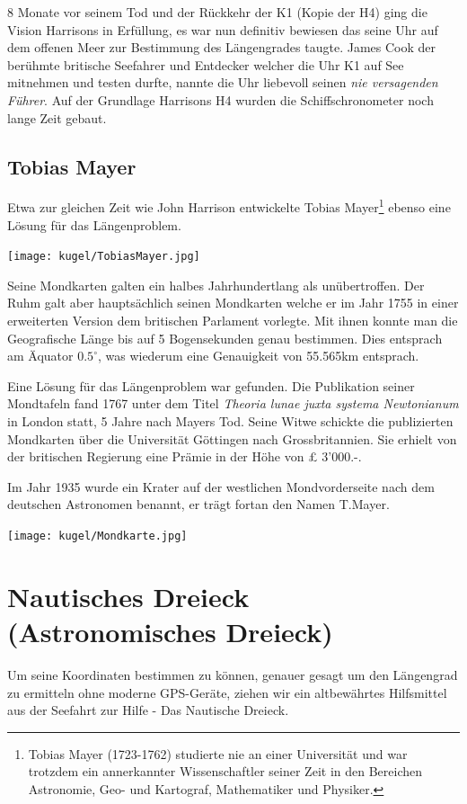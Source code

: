 \begin{refsection}
8 Monate vor seinem Tod und der Rückkehr der K1 (Kopie der H4) ging die Vision Harrisons in Erfüllung, es war nun definitiv bewiesen das seine Uhr auf dem offenen Meer zur Bestimmung des Längengrades taugte. James Cook der berühmte britische Seefahrer und Entdecker welcher die Uhr K1 auf See mitnehmen und testen durfte, nannte die Uhr liebevoll seinen \textit{nie versagenden Führer}.
Auf der Grundlage Harrisons H4 wurden die Schiffschronometer noch lange Zeit gebaut.



\subsection{Tobias Mayer}
Etwa zur gleichen Zeit wie John Harrison entwickelte Tobias Mayer\footnote{%
Tobias Mayer (1723-1762) studierte nie an einer Universität und war trotzdem ein annerkannter Wissenschaftler seiner Zeit in den Bereichen Astronomie, Geo- und Kartograf, Mathematiker und Physiker.}
ebenso eine Lösung für das Längenproblem.
\begin{center}
        \texttt{[image: kugel/TobiasMayer.jpg]}
\end{center}
Seine Mondkarten galten ein halbes Jahrhundertlang als unübertroffen. Der Ruhm galt aber hauptsächlich seinen Mondkarten welche er im Jahr 1755 in einer erweiterten Version dem britischen Parlament vorlegte.
Mit ihnen konnte man die Geografische Länge bis auf 5 Bogensekunden genau bestimmen. Dies entsprach am Äquator $0.5 ^{\circ}$, was wiederum eine Genauigkeit von 55.565km entsprach.

Eine Lösung für das Längenproblem war gefunden. Die Publikation seiner Mondtafeln fand 1767 unter dem Titel \textit{Theoria lunae juxta systema Newtonianum} in London statt, 5 Jahre nach Mayers Tod. 
Seine Witwe schickte die publizierten Mondkarten über die Universität Göttingen nach Grossbritannien. Sie erhielt von der britischen Regierung eine Prämie in der Höhe von £ 3’000.-.

Im Jahr 1935 wurde ein Krater auf der westlichen Mondvorderseite nach dem deutschen Astronomen benannt, er trägt fortan den Namen T.Mayer.
\begin{center}
        \texttt{[image: kugel/Mondkarte.jpg]}
\end{center}


\section{Nautisches Dreieck (Astronomisches Dreieck)}
Um seine Koordinaten bestimmen zu können, genauer gesagt um den Längengrad zu ermitteln ohne moderne GPS-Geräte, ziehen wir ein altbewährtes Hilfsmittel aus der Seefahrt zur Hilfe - Das Nautische Dreieck.


\end{refsection}
